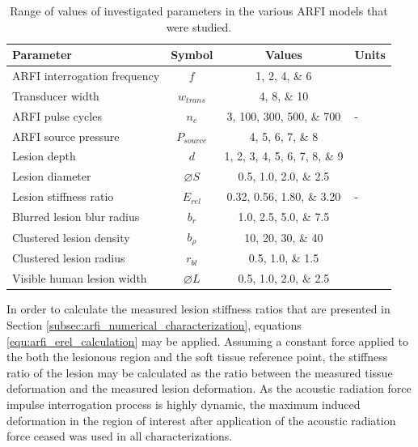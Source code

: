 			\begin{table}[!htb]
				\centering
				\caption[ARFI model investigated parameters]{Range of values of investigated parameters in the various ARFI models that were studied.}
				\label{tab:arfi-parametervalues}
				\begin{tabular}{lccs[table-unit-alignment = left]}
					\toprule
					Parameter & Symbol & Values & {Units} \\
					\midrule
					ARFI interrogation frequency & $f$ & \numlist{1;2;4;6} & \MHz \\
					Transducer width & $w_{trans}$ & \numlist{4;8;10} & \cm \\
					ARFI pulse cycles & $n_c$ & \numlist{3;100;300;500;700} & - \\
					ARFI source pressure & $P_{source}$ & \numlist{4;5;6;7;8} & \MPa \\
					Lesion depth & $d$ & \numlist{1;2;3;4;5;6;7;8;9} & \cm \\
					Lesion diameter & $\diameter S$ & \numlist{0.5;1.0;2.0;2.5} & \cm \\
					Lesion stiffness ratio & $E_{rel}$ & \numlist{0.32;0.56;1.80;3.20} & - \\
					Blurred lesion blur radius & $b_r$ & \numlist{1.0;2.5;5.0;7.5} & \mm \\
					Clustered lesion density & $b_\rho$ & \numlist{10;20;30;40} & \per\cm\squared \\
					Clustered lesion radius & $r_{bl}$ & \numlist{0.5;1.0;1.5} & \mm \\
					Visible human lesion width & $\diameter L$ & \numlist{0.5;1.0;2.0;2.5} & \cm \\
					\bottomrule
				\end{tabular}
			\end{table}

			In order to calculate the measured lesion stiffness ratios that are presented in Section \ref{subsec:arfi_numerical_characterization}, equations \ref{equ:arfi_erel_calculation} may be applied. Assuming a constant force applied to the both the lesionous region and the soft tissue reference point, the stiffness ratio of the lesion may be calculated as the ratio between the measured tissue deformation and the measured lesion deformation. As the acoustic radiation force impulse interrogation process is highly dynamic, the maximum induced deformation in the region of interest after application of the acoustic radiation force ceased was used in all characterizations.

